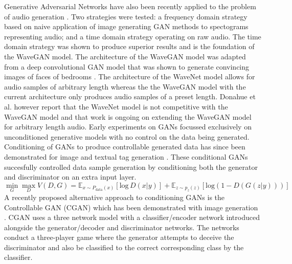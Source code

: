 \documentclass[a4paper, dvipsnames, titlepage]{article}
\begin{document}
\newline
\newline
Generative Adversarial Networks have also been recently applied to the problem of audio generation \citep{2018arXiv180204208D}.
Two strategies were tested: a frequency domain strategy based on naive application of image generating GAN methods to spectograms representing audio; and a time domain strategy operating on raw audio.
The time domain strategy was shown to produce superior results and is the foundation of the WaveGAN model.
The architecture of the WaveGAN model was adapted from a deep convolutional GAN model that was shown to generate convincing images of faces of bedrooms \citep{2015arXiv151106434R}.
\newline
\newline
The architecture of the WaveNet model allows for audio samples of arbitrary length whereas the the WaveGAN model with the current architecture only produces audio samples of a preset length.
Donahue et al. however report that the WaveNet model is not competitive with the WaveGAN model and that work is ongoing on extending the WaveGAN model for arbitrary length audio.
\newline
\newline
Early experiments on GANs focussed exclusively on unconditioned generative models with no control on the data being generated.
Conditioning of GANs to produce controllable generated data has since been demonstrated for image and textual tag generation \citep{2014arXiv1411.1784M}.
These conditional GANs succesfully controlled data sample generation by conditioning both the generator and discriminator on an extra input layer.
\begin{equation}
  \min_{G} \max_{D} V(D,G) = \mathbb{E}_{x \sim P_\mathrm{data}(x)}[\mathrm{log}\,D(x|y)] + \mathbb{E}_{z \sim p_z(z)}[\mathrm{log} (1 - D(G(z|y)))]
\end{equation}
\newline
\newline
A recently proposed alternative approach to conditioning GANs is the Controllable GAN (CGAN) which has been demonstrated with image generation \citep{2017arXiv170800598L}.
CGAN uses a three network model with a classifier/encoder network introduced alongside the generator/decoder and discriminator networks.
The networks conduct a three-player game where the generator attempts to deceive the discriminator and also be classified to the correct corresponding class by the classifier.

\newpage
\end{document}
